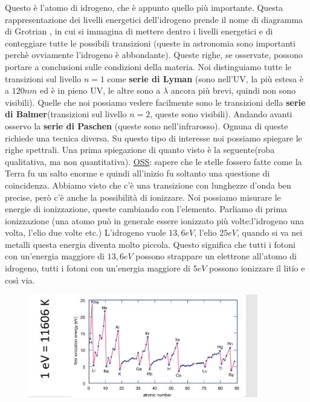 \documentclass[a4paper,11pt]{article}
\begin{document}
Questo è l'atomo di idrogeno, che è appunto quello più importante. Questa rappresentazione dei livelli energetici dell'idrogeno prende il nome di diagramma di Grotrian , in cui si immagina di mettere dentro i livelli energetici e di conteggiare tutte le possibili transizioni (queste in astronomia sono importanti perchè ovviamente l'idrogeno è abbondante). Queste righe, se osservate, possono portare a conclusioni sulle condizioni della materia.
\newline
Noi distinguiamo tutte le transizioni sul livello $n=1$ come \textbf{serie di Lyman} (sono nell'UV, la più estesa è a $120nm$ ed è in pieno UV, le altre sono a $\lambda$ ancora più brevi, quindi non sono visibili).
Quelle che noi possiamo vedere facilmente sono le transizioni della \textbf{serie di Balmer}(transizioni sul livello $n=2$, queste sono visibili).
Andando avanti osservo la \textbf{serie di Paschen} (queste sono nell'infrarosso).
\newline
Ognuna di queste richiede una tecnica diversa.
Su questo tipo di interesse noi possiamo spiegare le righe spettrali. Una prima spiegazione di quanto visto è la seguente(roba qualitativa, ma non quantitativa).
\newline
\underline{OSS}: sapere che le stelle fossero fatte come la Terra fu un salto enorme e quindi all'inizio fu soltanto una questione di coincidenza.
\newline
Abbiamo visto che c'è una transizione con lunghezze d'onda ben precise, però c'è anche la possibilità di ionizzare. Noi possiamo misurare le energie di ionizzazione, queste cambiando con l'elemento. Parliamo di prima ionizzazione (una atomo può in generale essere ionizzato più volte:l'idrogeno una volta, l'elio due volte etc.)
\newline
L'idrogeno vuole $13,6eV$, l'elio $25eV$, quando si va nei metalli questa energia diventa molto piccola. Questo significa che tutti i fotoni con un'energia maggiore di $13,6eV$ possono strappare un elettrone all'atomo di idrogeno, tutti i fotoni con un'energia maggiore di $5eV$ possono ionizzare il litio e così via.
\begin{figure}[h]
    \centering
    \includegraphics[width=10cm]{28-10.30(energie_prima_ionizzazione).png}
\label{fig:energie_di_prima_ionizzazione}
\end{figure}
\end{document}
